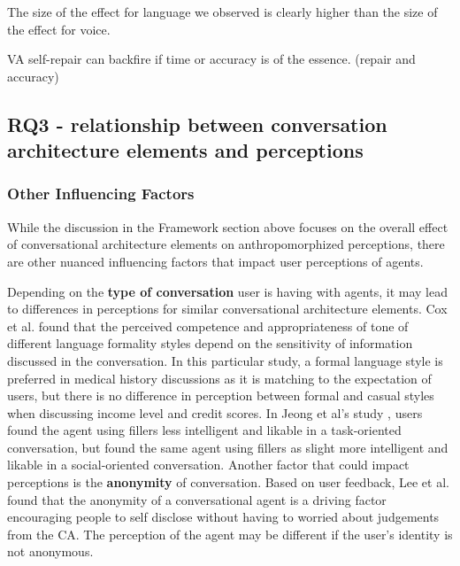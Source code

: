 \documentclass[sigconf,screen,review, anonymous]{acmart}
\newcommand{\cmt}[1]{}%
\begin{document}
The size of the effect for language we observed is clearly higher than the size of the effect for voice. \cite{habler2019effects}\cmt{[63]}

VA self-repair can backfire if time or accuracy is of the essence. (repair and accuracy) \cite{cuadra2021my}\cmt{[67]}


\subsection{RQ3 - relationship between conversation architecture elements and perceptions}

\subsubsection{Other Influencing Factors}

While the discussion in the Framework section above focuses on the overall effect of conversational architecture elements on anthropomorphized perceptions,  there are other nuanced influencing factors that impact user perceptions of agents. 

Depending on the \textbf{type of conversation} user is having with agents, it may lead to differences in perceptions for similar conversational architecture elements. Cox et al. \cite{cox2022does}\cmt{[27]} found that the perceived competence and appropriateness of tone of different language formality styles depend on the sensitivity of information discussed in the conversation. In this particular study, a formal language style is preferred in medical history discussions as it is matching to the expectation of users, but there is no difference in perception between formal and casual styles when discussing income level and credit scores. In Jeong et al's study \cite{jeong2019exploring}\cmt{[10]}, users found the agent using fillers less intelligent and likable in a task-oriented conversation, but found the same agent using fillers as slight more intelligent and likable in a social-oriented conversation. Another factor that could impact perceptions is the \textbf{anonymity} of conversation. Based on user feedback, Lee et al. \cite{lee2020hear}\cmt{[23]} found that the anonymity of a conversational agent is a driving factor encouraging people to self disclose without having to worried about judgements from the CA. The perception of the agent may be different if the user's identity is not anonymous.
\end{document}
